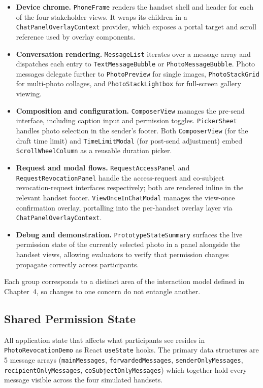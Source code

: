 \begin{itemize}
  \item \textbf{Device chrome.} \texttt{PhoneFrame} renders the handset shell and header for each of the four stakeholder views. It wraps its children in a \texttt{ChatPanelOverlayContext} provider, which exposes a portal target and scroll reference used by overlay components.
  \item \textbf{Conversation rendering.} \texttt{MessageList} iterates over a message array and dispatches each entry to \texttt{TextMessageBubble} or \texttt{PhotoMessageBubble}. Photo messages delegate further to \newline \texttt{PhotoPreview} for single images, \texttt{PhotoStackGrid} for multi-photo collages, and \texttt{PhotoStackLightbox} for full-screen gallery viewing.
  \item \textbf{Composition and configuration.} \texttt{ComposerView} manages the pre-send interface, including caption input and permission toggles. \texttt{PickerSheet} handles photo selection in the sender's footer. Both \texttt{ComposerView} (for the draft time limit) and \texttt{TimeLimitModal} (for post-send adjustment) embed \texttt{ScrollWheelColumn} as a reusable duration picker.
  \item \textbf{Request and modal flows.} \texttt{RequestAccessPanel} and \texttt{RequestRevocationPanel} handle the access-request and co-subject revocation-request interfaces respectively; both are rendered inline in the relevant handset footer. \texttt{ViewOnceInChatModal} manages the view-once confirmation overlay, portalling into the per-handset overlay layer via \texttt{ChatPanelOverlayContext}.
  \item \textbf{Debug and demonstration.} \texttt{PrototypeStateSummary} surfaces the live permission state of the currently selected photo in a panel alongside the handset views, allowing evaluators to verify that permission changes propagate correctly across participants.
\end{itemize}

\noindent
Each group corresponds to a distinct area of the interaction model defined in Chapter~4, so changes to one concern do not entangle another.



\subsection*{Shared Permission State}

All application state that affects what participants see resides in \texttt{PhotoRevocationDemo} as React \texttt{useState} hooks. The primary data structures are 5 message arrays (\texttt{mainMessages}, \texttt{forwardedMessages}, \texttt{senderOnlyMessages}, \texttt{recipientOnlyMessages}, \texttt{coSubjectOnlyMessages}) which together hold every message visible across the four simulated handsets.

